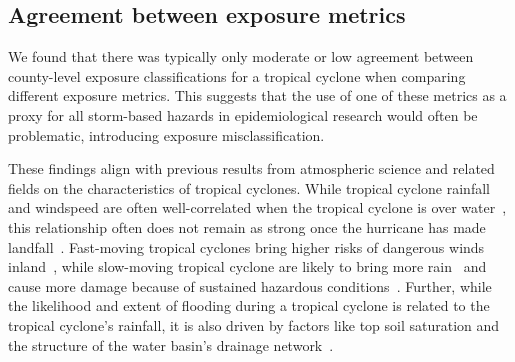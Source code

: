 \subsection*{Agreement between exposure metrics}

We found that there was typically only moderate or low agreement between
county-level exposure classifications for a tropical cyclone when comparing
different exposure metrics. This suggests that the use of one of these metrics
as a proxy for all storm-based hazards in epidemiological research would often
be problematic, introducing exposure misclassification.

\begin{comment}
For example, distance from a tropical cyclone's track is relatively easy to
measure and has been used as an operational metric of exposure to tropical
cyclones in previous large-scale studies (examples include ...). Since distance
itself does not constitute a hazard, distance is meant in these cases as a
surrogate to capture exposure to hazards from the tropical cyclone. However,
here we found that in assessing \ac{US} county-level exposure to tropical
cyclones, distance is, at best, a moderate, and often a very poor, surrogate
for exposure to the specific tropical cyclone hazards of high wind, extreme
rainfall, flooding, and tornadoes (Figure~\ref{fig:jaccard}). Therefore, use of
distance to assess tropical cyclone exposure for impact studies could result in
problematic exposure misclassification, which could mask true associations,
even strong associations, between tropical cyclone exposure and outcomes of
interest in impact studies~\parencite{savitz2016interpreting,
armstrong1998effect}.  
\end{comment}

These findings align with previous results from atmospheric science and related
fields on the characteristics of tropical cyclones. While tropical cyclone
rainfall and windspeed are often well-correlated when the tropical cyclone is
over water~\parencite{cerveny2000}, this relationship often does not remain as
strong once the hurricane has made landfall~\parencite{jiang2008}.  Fast-moving
tropical cyclones bring higher risks of dangerous winds
inland~\parencite{kruk2010}, while slow-moving tropical cyclone are likely to
bring more rain~\parencite{rappaport2000} and cause more damage because of
sustained hazardous conditions~\parencite{rezapour2014}. Further, while the
likelihood and extent of flooding during a tropical cyclone is related to the
tropical cyclone's rainfall, it is also driven by factors like top soil
saturation and the structure of the water basin's drainage
network~\parencite{chen2015, rees2001}. 

